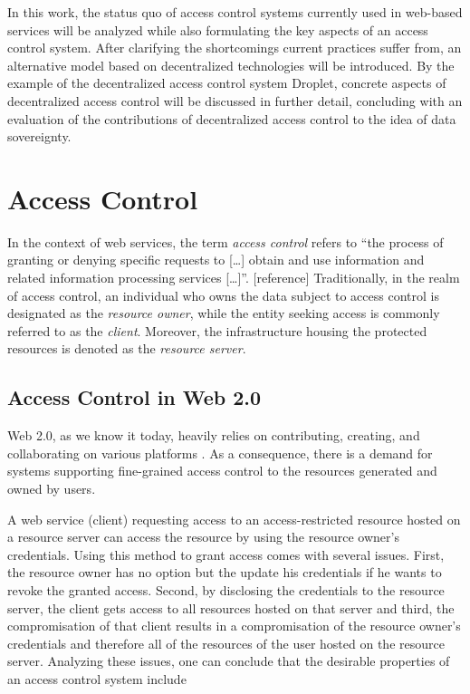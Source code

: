 \documentclass[conference]{IEEEtran}
\begin{document}
In this work, the status quo of access control systems currently used in web-based services will be analyzed while also formulating the key aspects of an access control system.
After clarifying the shortcomings current practices suffer from, an alternative model based on decentralized technologies will be introduced.
By the example of the decentralized access control system Droplet, concrete aspects of decentralized access control will be discussed in further detail, concluding with an evaluation of the contributions of decentralized access control to the idea of data sovereignty.

\section{Access Control}
In the context of web services, the term \textit{access control} refers to \enquote{the process of granting or denying specific requests to [\dots] obtain and use information and related information processing services [\dots]}. [reference] %
Traditionally, in the realm of access control, an individual who owns the data subject to access control is designated as the \textit{resource owner}, while the entity seeking access is commonly referred to as the \textit{client}.
Moreover, the infrastructure housing the protected resources is denoted as the \textit{resource server}.

\subsection{Access Control in Web 2.0}
Web 2.0, as we know it today, heavily relies on contributing, creating, and collaborating on various platforms \cite{community_web_2019}.
As a consequence, there is a demand for systems supporting fine-grained access control to the resources generated and owned by users.

A web service (client) requesting access to an access-restricted resource hosted on a resource server can access the resource by using the resource owner's credentials.
Using this method to grant access comes with several issues.
First, the resource owner has no option but the update his credentials if he wants to revoke the granted access.
Second, by disclosing the credentials to the resource server, the client gets access to all resources hosted on that server and third, the compromisation of that client results in a compromisation of the resource owner's credentials and therefore all of the resources of the user hosted on the resource server.
Analyzing these issues, one can conclude that the desirable properties of an access control system include
\end{document}
